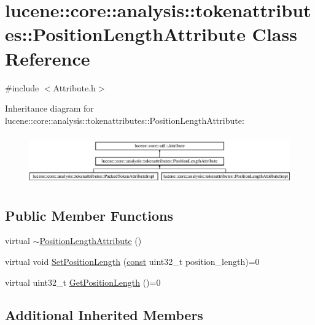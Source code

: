 \hypertarget{classlucene_1_1core_1_1analysis_1_1tokenattributes_1_1PositionLengthAttribute}{}\section{lucene\+:\+:core\+:\+:analysis\+:\+:tokenattributes\+:\+:Position\+Length\+Attribute Class Reference}
\label{classlucene_1_1core_1_1analysis_1_1tokenattributes_1_1PositionLengthAttribute}


{\ttfamily \#include $<$Attribute.\+h$>$}

Inheritance diagram for lucene\+:\+:core\+:\+:analysis\+:\+:tokenattributes\+:\+:Position\+Length\+Attribute\+:\begin{figure}[H]
\begin{center}
\leavevmode
\includegraphics[height=2.176166cm]{classlucene_1_1core_1_1analysis_1_1tokenattributes_1_1PositionLengthAttribute}
\end{center}
\end{figure}
\subsection*{Public Member Functions}
\begin{DoxyCompactItemize}
\item 
virtual \mbox{\hyperlink{classlucene_1_1core_1_1analysis_1_1tokenattributes_1_1PositionLengthAttribute_a1a1260d8ec8ea8d25dda405698268d3f}{$\sim$\+Position\+Length\+Attribute}} ()
\item 
virtual void \mbox{\hyperlink{classlucene_1_1core_1_1analysis_1_1tokenattributes_1_1PositionLengthAttribute_a514415965bae0dd392cbb8d65ea4d808}{Set\+Position\+Length}} (\mbox{\hyperlink{ZlibCrc32_8h_a2c212835823e3c54a8ab6d95c652660e}{const}} uint32\+\_\+t position\+\_\+length)=0
\item 
virtual uint32\+\_\+t \mbox{\hyperlink{classlucene_1_1core_1_1analysis_1_1tokenattributes_1_1PositionLengthAttribute_a6325424899959bb480f161e0d5490bfd}{Get\+Position\+Length}} ()=0
\end{DoxyCompactItemize}
\subsection*{Additional Inherited Members}


